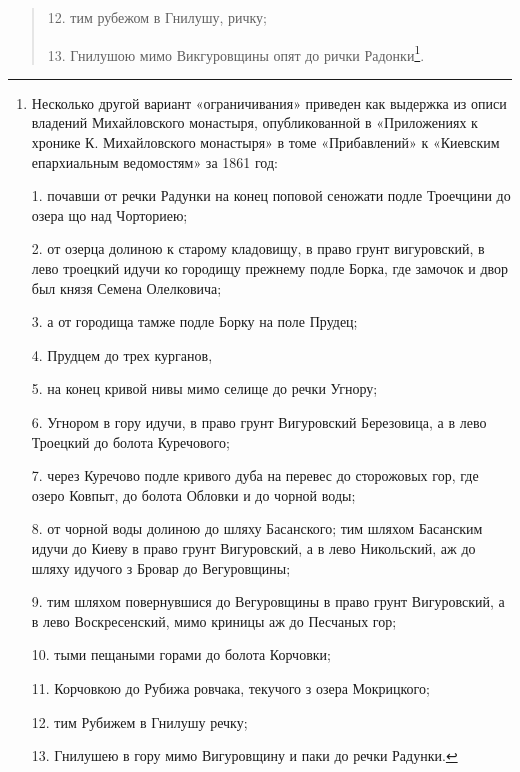 \begin{quotation}
12. тим рубежом в Гнилушу, ричку; 

13. Гнилушою мимо Викгуровщины опят до рички Радонки\footnote{Несколько другой вариант «ограничивания» приведен как выдержка из описи владений Михайловского монастыря, опубликованной в «Приложениях к хронике К. Михайловского монастыря» в томе «Прибавлений» к «Киевским епархиальным ведомостям» за 1861 год:

1. почавши от речки Радунки на конец поповой сеножати подле Троечцини до озера що над Чорториею;

2. от озерца долиною к старому кладовищу, в право грунт вигуровский, в лево троецкий идучи ко городищу прежнему подле Борка, где замочок и двор был князя Семена Олелковича; 

3. а от городища тамже подле Борку на поле Прудец; 

4. Прудцем до трех курганов,

5. на конец кривой нивы мимо селище до речки Угнору;

6. Угнором в гору идучи, в право грунт Вигуровский Березовица, а в лево Троецкий до болота Куречового;

7. через Куречово подле кривого дуба на перевес до сторожовых гор, где озеро Ковпыт, до болота Обловки и до чорной воды;

8. от чорной воды долиною до шляху Басанского; тим шляхом Басанским идучи до Киеву в право грунт Вигуровский, а в лево Никольский, аж до шляху идучого з Бровар до Вегуровщины;

9. тим шляхом повернувшися до Вегуровщины в право грунт Вигуровский, а в лево Воскресенский, мимо криницы аж до Песчаных гор;

10. тыми пещаными горами до болота Корчовки;

11. Корчовкою до Рубижа ровчака, текучого з озера Мокрицкого;

12. тим Рубижем в Гнилушу речку;

13. Гнилушею в гору мимо Вигуровщину и паки до речки Радунки.}.


\end{quotation}
